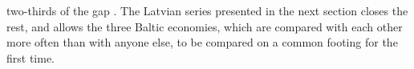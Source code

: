 two-thirds of the gap \parencite{klimantas2026soviet,klimantas2025estonia}. The Latvian series presented in the next section closes the rest, and allows the three Baltic economies, which are compared with each other more often than with anyone else, to be compared on a common footing for the first time.
